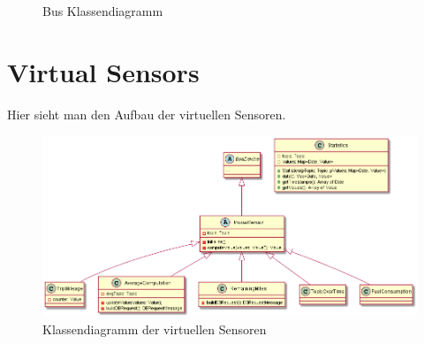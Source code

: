 \documentclass[entwurf.tex]{subfiles}
\begin{document}
  		\begin{figure}[H]
  			\begin{center}
  				\caption{Bus Klassendiagramm}
  			\end{center}
  		\end{figure}
  	
  	\newpage
  	\section{Virtual Sensors}
		Hier sieht man den Aufbau der virtuellen Sensoren.
		\begin{figure}[H]
  			\begin{center}
 				\includegraphics[width=0.8\textheight,angle=90]{diagrams/VirtualSensors.png}
  				\caption{Klassendiagramm der virtuellen Sensoren}
  			\end{center}
  		\end{figure}
  	\newpage
\end{document}
